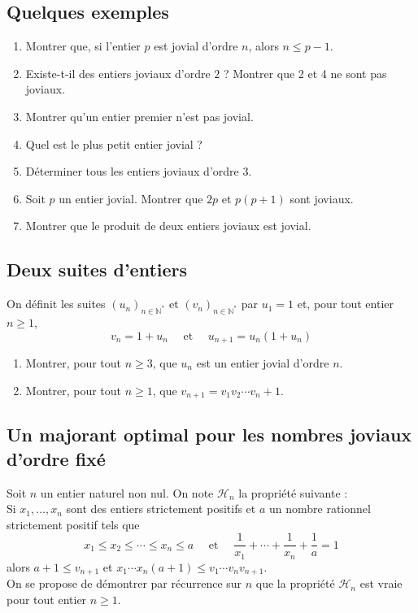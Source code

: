 \documentclass[landscape,twocolumn,leqno,a4paper,10pt]{report} %
\newcommand\n{\noindent}
\renewcommand{\geq}{\geqslant}
\renewcommand{\leq}{\leqslant}
\begin{document}
\subsection{Quelques exemples}

\begin{enumerate}
	\item Montrer que, si l'entier $p$ est jovial d'ordre $n$, alors $n \leq p-1$.
	\item Existe-t-il des entiers joviaux d'ordre $2$ ? Montrer que 2 et 4 ne sont pas joviaux.
	\item Montrer qu'un entier premier n'est pas jovial.
	\item Quel est le plus petit entier jovial ?
	\item Déterminer tous les entiers joviaux d'ordre $3$.
	\item Soit $p$ un entier jovial. Montrer que $2 p$ et $p(p+1)$ sont joviaux.
	\item Montrer que le produit de deux entiers joviaux est jovial.
\end{enumerate}

\subsection{Deux suites d'entiers}

\n On définit les suites $\left(u_{n}\right)_{n \in \mathbb{N}^{*}}$ et $\left(v_{n}\right)_{n \in \mathbb{N}^{*}}$ par $u_{1}=1$ et, pour tout entier $n \geq 1$,
$$v_{n}=1+u_{n} \quad \text { et } \quad u_{n+1}=u_{n}\left(1+u_{n}\right)$$

\begin{enumerate}
	\item Montrer, pour tout $n \geq 3$, que $u_{n}$ est un entier jovial d'ordre $n$.
	\item Montrer, pour tout $n \geq 1$, que $v_{n+1}=v_{1} v_{2} \cdots v_{n}+1$. 
\end{enumerate}

\subsection{Un majorant optimal pour les nombres joviaux d'ordre fixé}

\n Soit $n$ un entier naturel non nul. On note $\mathscr{H}_{n}$ la propriété suivante :\\
Si $x_{1}, \ldots, x_{n}$ sont des entiers strictement positifs et $a$ un nombre rationnel strictement positif tels que
$$x_{1} \leq x_{2} \leq \cdots \leq x_{n} \leq a \quad \text { et } \quad \frac{1}{x_{1}}+\cdots+\frac{1}{x_{n}}+\frac{1}{a}=1$$
alors $a+1 \leq v_{n+1}$ et $x_{1} \cdots x_{n}(a+1) \leq v_{1} \cdots v_{n} v_{n+1}$.\\
On se propose de démontrer par récurrence sur $n$ que la propriété $\mathscr{H}_{n}$ est vraie pour tout entier $n \geq 1$.
\end{document}
